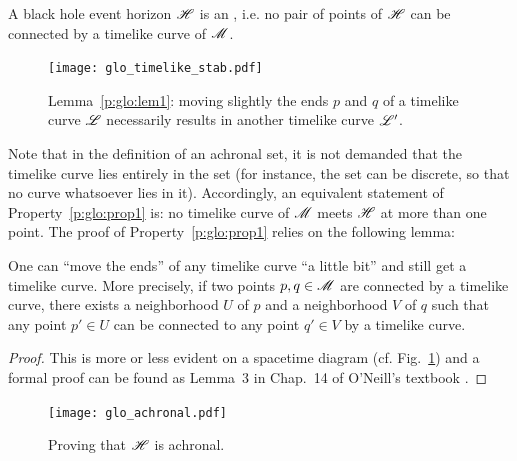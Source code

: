\begin{prop}
\label{p:glo:prop1}
A black hole event horizon $\mathscr{H}$ is an , i.e. no pair of points of $\mathscr{H}$ can be connected
by a timelike curve of $\mathscr{M}$.
\end{prop}

\begin{figure}
\centerline{\texttt{[image: glo\_timelike\_stab.pdf]}}
\caption[]{\label{f:glo:timelike_stab} \footnotesize
Lemma~\ref{p:glo:lem1}: moving slightly the ends $p$ and $q$ of a timelike curve $\mathscr{L}$
necessarily results in another timelike curve $\mathscr{L}'$.}
\end{figure}

Note that in the definition of an achronal set, it is not demanded that the timelike
curve lies entirely in the set (for instance, the set can be discrete, so that no curve
whatsoever lies in it). Accordingly,
an equivalent statement of Property~\ref{p:glo:prop1} is: no timelike curve of $\mathscr{M}$
meets $\mathscr{H}$ at more than one point.
The proof of Property~\ref{p:glo:prop1} relies on the following lemma:

\begin{lemma}
\label{p:glo:lem1}
One can ``move the ends'' of any timelike curve
``a little bit'' and still get a timelike curve. More precisely,
if two points $p,q\in\mathscr{M}$ are connected by a timelike curve,
there exists
a neighborhood $U$ of $p$ and a neighborhood $V$ of $q$ such that
any point $p'\in U$ can be connected to any point $q'\in V$ by a timelike curve.
\end{lemma}

\begin{proof}
This is more or less evident on a spacetime diagram (cf. Fig.~\ref{f:glo:timelike_stab})
and a formal proof
can be found as Lemma~3 in Chap.~14 of O'Neill's textbook \cite{ONeil83}.
\end{proof}

\begin{figure}
\centerline{\texttt{[image: glo\_achronal.pdf]}}
\caption[]{\label{f:glo:achronal} \footnotesize
Proving that $\mathscr{H}$ is achronal.}
\end{figure}

